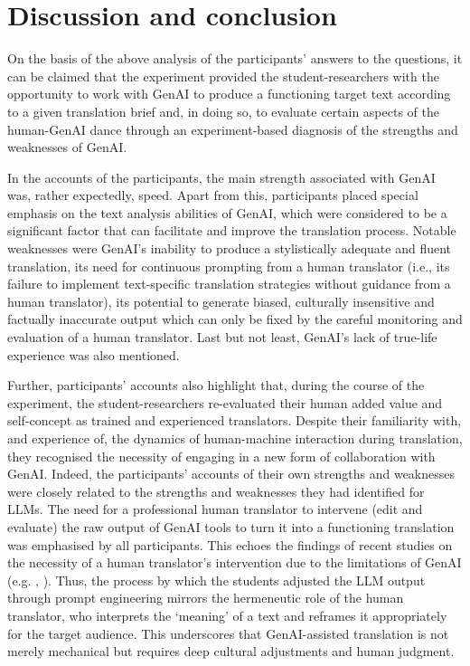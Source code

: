 \documentclass[output=paper,colorlinks,citecolor=brown]{langscibook}
\begin{document}
 \section{Discussion and conclusion}
On the basis of the above analysis of the participants’ answers to the questions, it can be claimed that the experiment provided the student-researchers with the opportunity to work with GenAI to produce a functioning target text according to a given translation brief and, in doing so, to evaluate certain aspects of the human-GenAI dance through an experiment-based diagnosis of the strengths and weaknesses of GenAI.

In the accounts of the participants, the main strength associated with GenAI was, rather expectedly, speed. Apart from this, participants placed special emphasis on the text analysis abilities of GenAI, which were considered to be a significant factor that can facilitate and improve the translation process. Notable weaknesses were GenAI’s inability to produce a stylistically adequate and fluent translation, its need for continuous prompting from a human translator (i.e., its failure to implement text-specific translation strategies without guidance from a human translator), its potential to generate biased, culturally insensitive and factually inaccurate output which can only be fixed by the careful monitoring and evaluation of a human translator. Last but not least, GenAI’s lack of true-life experience was also mentioned.

Further, participants' accounts also highlight that, during the course of the experiment, the student-researchers re-evaluated their human added value and self-concept as trained and experienced translators. Despite their familiarity with, and experience of, the dynamics of human-machine interaction during translation, they recognised the necessity of engaging in a new form of collaboration with GenAI. Indeed, the participants’ accounts of their own strengths and weaknesses were closely related to the strengths and weaknesses they had identified for LLMs. The need for a professional human translator to intervene (edit and evaluate) the raw output of GenAI tools to turn it into a functioning translation was emphasised by all participants. This echoes the findings of recent studies on the necessity of a human translator’s intervention due to the limitations of GenAI (e.g. \cite{Alimen2023}, \cite{SenemMilufer2023}). Thus, the process by which the students adjusted the LLM output through prompt engineering mirrors the hermeneutic role of the human translator, who interprets the ‘meaning’ of a text and reframes it appropriately for the target audience. This underscores that GenAI-assisted translation is not merely mechanical but requires deep cultural adjustments and human judgment.
\end{document}
